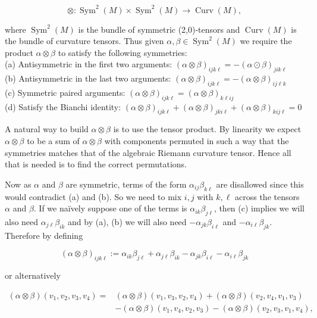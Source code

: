 \documentclass[10pt, letterpaper]{article}
\begin{document}
$$
\otimes: \operatorname{Sym}^{2}(M) \times \operatorname{Sym}^{2}(M) \rightarrow \operatorname{Curv}(M),
$$

where $\operatorname{Sym}^{2}(M)$ is the bundle of symmetric (2,0)-tensors and $\operatorname{Curv}(M)$ is the bundle of curvature tensors. Thus given $\alpha, \beta \in \operatorname{Sym}^{2}(M)$ we require the product $\alpha \otimes \beta$ to satisfy the following symmetries:\\
(a) Antisymmetric in the first two arguments: $(\alpha \otimes \beta)_{i j k \ell}=-(\alpha \odot \beta)_{j i k \ell}$\\
(b) Antisymmetric in the last two arguments: $(\alpha \otimes \beta)_{i j k \ell}=-(\alpha \otimes \beta)_{i j \ell k}$\\
(c) Symmetric paired arguments: $(\alpha \otimes \beta)_{i j k \ell}=(\alpha \otimes \beta)_{k \ell i j}$\\
(d) Satisfy the Bianchi identity: $(\alpha \otimes \beta)_{i j k \ell}+(\alpha \otimes \beta)_{j k i \ell}+(\alpha \otimes \beta)_{k i j \ell}=0$

A natural way to build $\alpha \otimes \beta$ is to use the tensor product. By linearity we expect $\alpha \otimes \beta$ to be a sum of $\alpha \otimes \beta$ with components permuted in such a way that the symmetries matches that of the algebraic Riemann curvature tensor. Hence all that is needed is to find the correct permutations.

Now as $\alpha$ and $\beta$ are symmetric, terms of the form $\alpha_{i j} \beta_{k \ell}$ are disallowed since this would contradict (a) and (b). So we need to mix $i, j$ with $k, \ell$ across the tensors $\alpha$ and $\beta$. If we naïvely suppose one of the terms is $\alpha_{i k} \beta_{j \ell}$, then (c) implies we will also need $\alpha_{j \ell} \beta_{i k}$ and by (a), (b) we will also need $-\alpha_{j k} \beta_{i \ell}$ and $-\alpha_{i \ell} \beta_{j k}$. Therefore by defining

$$
(\alpha \otimes \beta)_{i j k \ell}:=\alpha_{i k} \beta_{j \ell}+\alpha_{j \ell} \beta_{i k}-\alpha_{j k} \beta_{i \ell}-\alpha_{i \ell} \beta_{j k}
$$

or alternatively

$$
\begin{aligned}
(\alpha \otimes \beta)\left(v_{1}, v_{2}, v_{3}, v_{4}\right)= & (\alpha \otimes \beta)\left(v_{1}, v_{3}, v_{2}, v_{4}\right)+(\alpha \otimes \beta)\left(v_{2}, v_{4}, v_{1}, v_{3}\right) \\
& -(\alpha \otimes \beta)\left(v_{1}, v_{4}, v_{2}, v_{3}\right)-(\alpha \otimes \beta)\left(v_{2}, v_{3}, v_{1}, v_{4}\right),
\end{aligned}
$$
\end{document}
